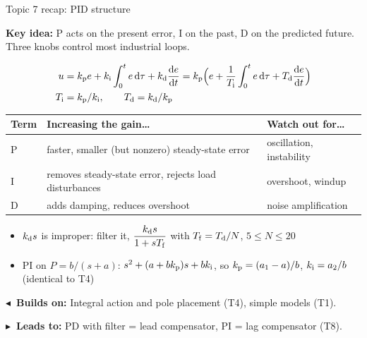 \documentclass[10pt]{beamer-control}
\newcommand\LINKS[2]{%
  \par\vfill
  {\scriptsize\setlength\fboxsep{3pt}%
  \colorbox{AUHighlight!10}{\parbox{\dimexpr\linewidth-6pt\relax}{%
    \textbf{\color{AUHighlight}$\blacktriangleleft$~Builds on:} #1\par
    \textbf{\color{AUHighlight}$\blacktriangleright$~Leads to:} #2%
    \hfill\hyperlink{coursemap}{\beamerbutton{Course map}}}}}%
}
\newcommand\KEYIDEA[1]{%
  {\setlength\fboxsep{4pt}%
  \colorbox{NorthTce!12}{\parbox{\dimexpr\linewidth-8pt\relax}{\small\textbf{Key idea:} #1}}}\par\smallskip
}
\begin{document}
\begin{frame}[label=topic7]{Topic 7 recap: PID structure}
  \KEYIDEA{P acts on the present error, I on the past, D on the predicted future. Three knobs control most industrial loops.}
  \vspace{-1ex}
  \begin{align*}
    u &= k_{\mathrm{p}} e + k_{\mathrm{i}}\int_0^t e\,\mathrm{d}\tau + k_{\mathrm{d}}\frac{\mathrm{d} e}{\mathrm{d} t}
    = k_{\mathrm{p}}\Bigl(e + \frac{1}{T_{\mathrm{i}}}\int_0^t e\,\mathrm{d}\tau + T_{\mathrm{d}}\frac{\mathrm{d} e}{\mathrm{d} t}\Bigr)\\
    T_{\mathrm{i}} &= k_{\mathrm{p}}/k_{\mathrm{i}}, \qquad T_{\mathrm{d}} = k_{\mathrm{d}}/k_{\mathrm{p}}
  \end{align*}
  \begin{center}
    \footnotesize
    \renewcommand\arraystretch{1.2}
    \begin{tabular}{@{}lll@{}}
      \toprule
      Term & Increasing the gain\ldots & Watch out for\ldots\\
      \midrule
      P & faster, smaller (but nonzero) steady-state error & oscillation, instability\\
      I & removes steady-state error, rejects load disturbances & overshoot, windup\\
      D & adds damping, reduces overshoot & noise amplification\\
      \bottomrule
    \end{tabular}
  \end{center}
  \footnotesize
  \begin{itemize}
    \item $k_{\mathrm{d}} s$ is improper: filter it, $\dfrac{k_{\mathrm{d}} s}{1+sT_{\mathrm{f}}}$ with $T_{\mathrm{f}} = T_{\mathrm{d}}/N$, $5\le N\le 20$
    \item PI on $P=b/(s+a)$: $s^2 + (a+bk_{\mathrm{p}})s + bk_{\mathrm{i}}$, so $k_{\mathrm{p}} = (a_1-a)/b$, $k_{\mathrm{i}} = a_2/b$ \alert{(identical to T4)}
  \end{itemize}
  \LINKS{Integral action and pole placement (T4), simple models (T1).}{PD with filter = lead compensator, PI = lag compensator (T8).}
\end{frame}
\end{document}
